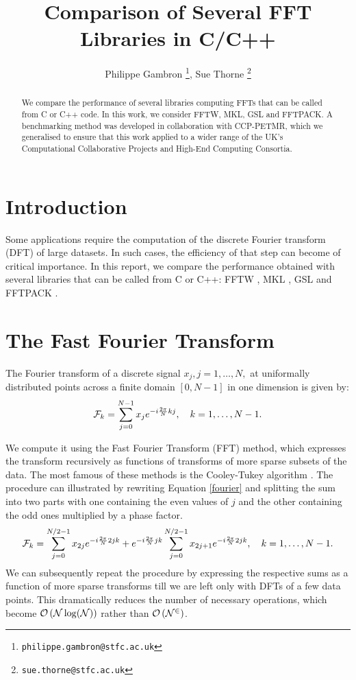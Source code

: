 \documentclass[12pt, a4paper]{article}
\date{}
\begin{document}
\title{Comparison of Several FFT Libraries in C/C++}
\author{Philippe Gambron \thanks{\texttt{philippe.gambron{@}stfc.ac.uk}}, Sue Thorne \thanks{\texttt{sue.thorne{@}stfc.ac.uk}}}
\maketitle
\begin{abstract}
We compare the performance of several libraries computing FFTs that can be 
called from C or C++ code. In this work, we consider FFTW, MKL, GSL and 
FFTPACK. A benchmarking method was developed in collaboration with CCP-PETMR, 
which we generalised to ensure that this work applied to a wider range of the 
UK's Computational Collaborative Projects and High-End Computing Consortia.
\end{abstract}
\section{Introduction}
Some applications require the computation of the discrete Fourier transform 
(DFT) of large datasets. In such cases, the efficiency of that step can 
become of critical importance. In this report, we compare the performance 
obtained with several libraries that can be called from C or C++:  FFTW \cite{fftw}, MKL \cite{mkl}, GSL \cite{gsl} and FFTPACK \cite{fftpack}.

\section{The Fast Fourier Transform}

The Fourier transform of a discrete signal $x_j, j=1,\ldots,N,$ at uniformally distributed points across a finite domain $[0,N-1]$ in one dimension is given by:
\begin{equation}\label{fourier}
{\cal F}_k=\sum_{j=0}^{N-1} x_j e^{-i\frac{2\pi}{N}kj}, \quad k=1,\ldots,N-1.
\end{equation}

We compute it using the Fast Fourier Transform (FFT) method, which expresses 
the transform recursively as functions of transforms of more sparse subsets 
of the data. The most famous of these methods is the Cooley-Tukey algorithm 
\cite{CT}. The procedure can illustrated by rewriting Equation \ref{fourier} 
and splitting the sum into two parts with one containing the even values of 
$j$ and the other containing the odd ones multiplied by a phase factor.
\begin{equation}\label{ct}
{\cal F}_k=\sum_{j=0}^{N/2-1}x_{2j}e^{-i\frac{2\pi}{N}2jk}+e^{-i\frac{2\pi}{N}jk}\sum_{j=0}^{N/2-1}x_{2j+1}e^{-i\frac{2\pi}{N}2jk}, \quad k=1,\ldots, N-1.
\end{equation}
We can subsequently repeat the procedure by expressing the respective sums as a function of more sparse transforms till we are left only with DFTs of a few data points. This dramatically reduces the number of necessary operations, which become  $\cal{O}\left(N\log(N)\right)$ rather than $\cal{O}\left(N^2\right)$.
\end{document}
